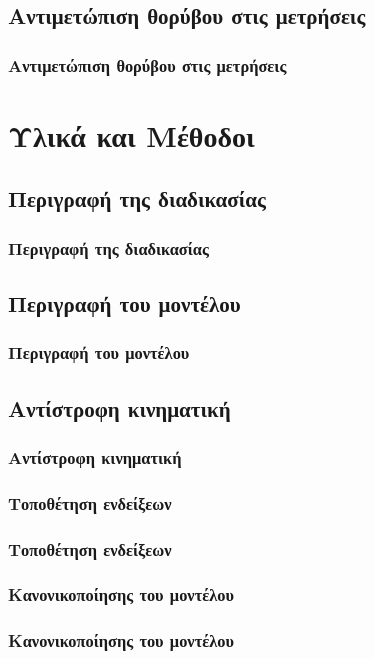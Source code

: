 \documentclass[8pt,sans,mathserif,aspectratio=43]{beamer}%
\begin{document}
\subsection{Αντιμετώπιση θορύβου στις μετρήσεις}
\begin{frame}
\frametitle{Αντιμετώπιση θορύβου στις μετρήσεις}

\end{frame}

\section{Υλικά και Μέθοδοι}
\subsection{Περιγραφή της διαδικασίας}
\begin{frame}
\frametitle{Περιγραφή της διαδικασίας}

\end{frame}

\subsection{Περιγραφή του μοντέλου}
\begin{frame}
\frametitle{Περιγραφή του μοντέλου}

\end{frame}

\subsection{Αντίστροφη κινηματική}
\begin{frame}
\frametitle{Αντίστροφη κινηματική}

\end{frame}

\subsubsection{Τοποθέτηση ενδείξεων}
\begin{frame}
\frametitle{Τοποθέτηση ενδείξεων}

\end{frame}

\subsubsection{Κανονικοποίησης του μοντέλου}
\begin{frame}
\frametitle{Κανονικοποίησης του μοντέλου}

\end{frame}
\end{document}
